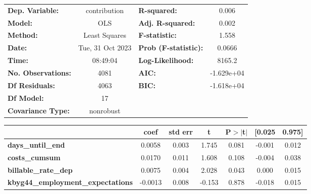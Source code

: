 \begin{center}
\begin{tabular}{lclc}
\toprule
\textbf{Dep. Variable:}                     &   contribution   & \textbf{  R-squared:         } &     0.006   \\
\textbf{Model:}                             &       OLS        & \textbf{  Adj. R-squared:    } &     0.002   \\
\textbf{Method:}                            &  Least Squares   & \textbf{  F-statistic:       } &     1.558   \\
\textbf{Date:}                              & Tue, 31 Oct 2023 & \textbf{  Prob (F-statistic):} &   0.0666    \\
\textbf{Time:}                              &     08:49:04     & \textbf{  Log-Likelihood:    } &    8165.2   \\
\textbf{No. Observations:}                  &        4081      & \textbf{  AIC:               } & -1.629e+04  \\
\textbf{Df Residuals:}                      &        4063      & \textbf{  BIC:               } & -1.618e+04  \\
\textbf{Df Model:}                          &          17      & \textbf{                     } &             \\
\textbf{Covariance Type:}                   &    nonrobust     & \textbf{                     } &             \\
\bottomrule
\end{tabular}
\begin{tabular}{lcccccc}
                                            & \textbf{coef} & \textbf{std err} & \textbf{t} & \textbf{P$> |$t$|$} & \textbf{[0.025} & \textbf{0.975]}  \\
\midrule
\textbf{days\_until\_end}                   &       0.0058  &        0.003     &     1.745  &         0.081        &       -0.001    &        0.012     \\
\textbf{costs\_cumsum}                      &       0.0170  &        0.011     &     1.608  &         0.108        &       -0.004    &        0.038     \\
\textbf{billable\_rate\_dep}                &       0.0075  &        0.004     &     2.028  &         0.043        &        0.000    &        0.015     \\
\textbf{kbyg44\_employment\_expectations}   &      -0.0013  &        0.008     &    -0.153  &         0.878        &       -0.018    &        0.015     \\

\end{tabular}
\end{center}
